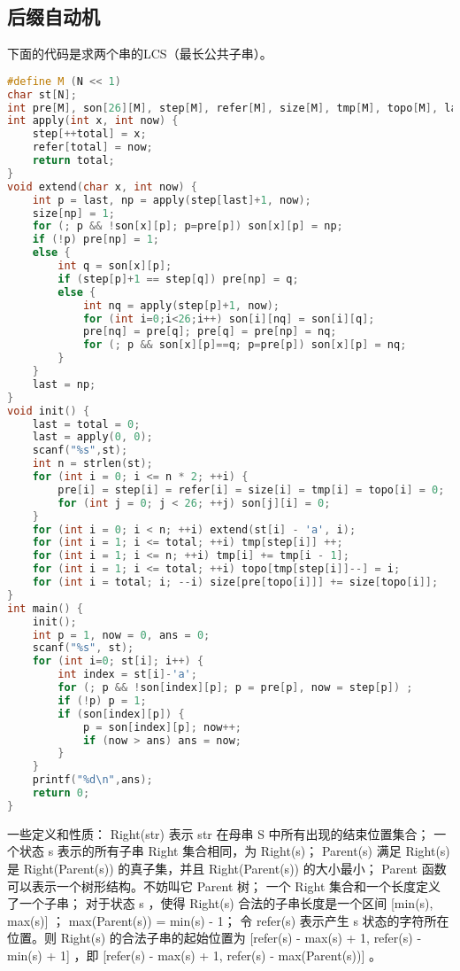 \documentclass{article}
\begin{document}
\subsection{后缀自动机}
下面的代码是求两个串的LCS（最长公共子串）。
\begin{lstlisting}[language=C++]
#define M (N << 1)
char st[N];
int pre[M], son[26][M], step[M], refer[M], size[M], tmp[M], topo[M], last, total;
int apply(int x, int now) {
	step[++total] = x;
	refer[total] = now;
	return total;
}
void extend(char x, int now) {
	int p = last, np = apply(step[last]+1, now);
	size[np] = 1;
	for (; p && !son[x][p]; p=pre[p]) son[x][p] = np;
	if (!p) pre[np] = 1;
	else {
		int q = son[x][p];
		if (step[p]+1 == step[q]) pre[np] = q;
		else {
			int nq = apply(step[p]+1, now);
			for (int i=0;i<26;i++) son[i][nq] = son[i][q];
			pre[nq] = pre[q]; pre[q] = pre[np] = nq;
			for (; p && son[x][p]==q; p=pre[p]) son[x][p] = nq;
		}
	}
	last = np;
}
void init() {
	last = total = 0;
	last = apply(0, 0);
	scanf("%s",st);
	int n = strlen(st);
	for (int i = 0; i <= n * 2; ++i) {
		pre[i] = step[i] = refer[i] = size[i] = tmp[i] = topo[i] = 0;
		for (int j = 0; j < 26; ++j) son[j][i] = 0;
	}
	for (int i = 0; i < n; ++i) extend(st[i] - 'a', i);
	for (int i = 1; i <= total; ++i) tmp[step[i]] ++;
	for (int i = 1; i <= n; ++i) tmp[i] += tmp[i - 1];
	for (int i = 1; i <= total; ++i) topo[tmp[step[i]]--] = i;
	for (int i = total; i; --i) size[pre[topo[i]]] += size[topo[i]];
}
int main() {
	init();
	int p = 1, now = 0, ans = 0;
	scanf("%s", st);
	for (int i=0; st[i]; i++) {
		int index = st[i]-'a';
		for (; p && !son[index][p]; p = pre[p], now = step[p]) ;
		if (!p) p = 1;
		if (son[index][p]) {
			p = son[index][p]; now++;
			if (now > ans) ans = now;
		}
	}
	printf("%d\n",ans);
	return 0;
}
\end{lstlisting}

一些定义和性质：
 Right(str) 表示 str 在母串 S 中所有出现的结束位置集合；
 一个状态 s 表示的所有子串 Right 集合相同，为 Right(s)；
 Parent(s) 满足 Right(s) 是 Right(Parent(s)) 的真子集，并且 Right(Parent(s)) 的大小最小；
 Parent 函数可以表示一个树形结构。不妨叫它 Parent 树；
 一个 Right 集合和一个长度定义了一个子串；
 对于状态 s ，使得 Right(s) 合法的子串长度是一个区间 [min(s), max(s)] ；
 max(Parent(s)) = min(s) - 1；
 令 refer(s) 表示产生 s 状态的字符所在位置。则 Right(s) 的合法子串的起始位置为 [refer(s) - max(s) + 1, refer(s) - min(s) + 1] ，即 [refer(s) - max(s) + 1, refer(s) - max(Parent(s))] 。
\end{document}

